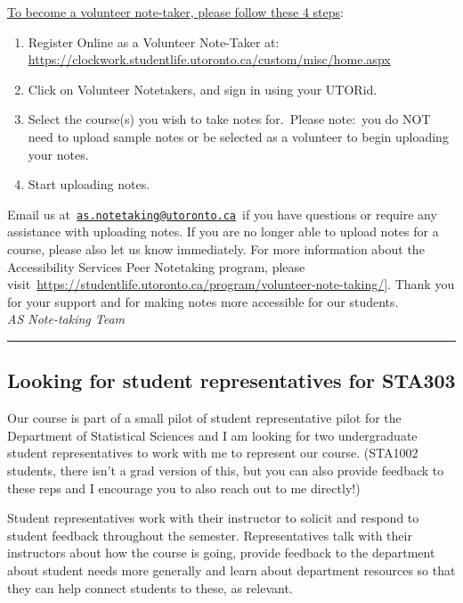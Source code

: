 \documentclass[
  openany]{book}
\begin{document}
\underline{To become a volunteer note-taker, please follow these 4 steps}:

\begin{enumerate}
\def\labelenumi{\arabic{enumi}.}
\item
  Register Online as a Volunteer Note-Taker at: \url{https://clockwork.studentlife.utoronto.ca/custom/misc/home.aspx}
\item
  Click on Volunteer Notetakers, and sign in using your UTORid.
\item
  Select the course(s) you wish to take notes for.~Please note:~you do NOT need to upload sample notes or be selected as a volunteer to begin uploading your notes.
\item
  Start uploading notes.
\end{enumerate}

Email us at~\href{mailto:as.notetaking@utoronto.ca}{\nolinkurl{as.notetaking@utoronto.ca}}~if you have questions or require any assistance with uploading notes. If you are no longer able to upload notes for a course, please also let us know immediately. For more information about the Accessibility Services Peer Notetaking program, please visit~\href{https://studentlife.utoronto.ca/program/volunteer-note-taking}{https://studentlife.utoronto.ca/program/volunteer-note-taking/}{]}. Thank you for your support and for making notes more accessible for our students.\\

\emph{AS Note-taking Team\\
}

\begin{center}\rule{0.5\linewidth}{0.5pt}\end{center}

\hypertarget{studentrep}{%
\subsection{Looking for student representatives for STA303}\label{studentrep}}

Our course is part of a small pilot of student representative pilot for the Department of Statistical Sciences and I am looking for two undergraduate student representatives to work with me to represent our course. (STA1002 students, there isn't a grad version of this, but you can also provide feedback to these reps and I encourage you to also reach out to me directly!)

Student representatives work with their instructor to solicit and respond to student feedback throughout the semester. Representatives talk with their instructors about how the course is going, provide feedback to the department about student needs more generally and learn about department resources so that they can help connect students to these, as relevant.
\end{document}
